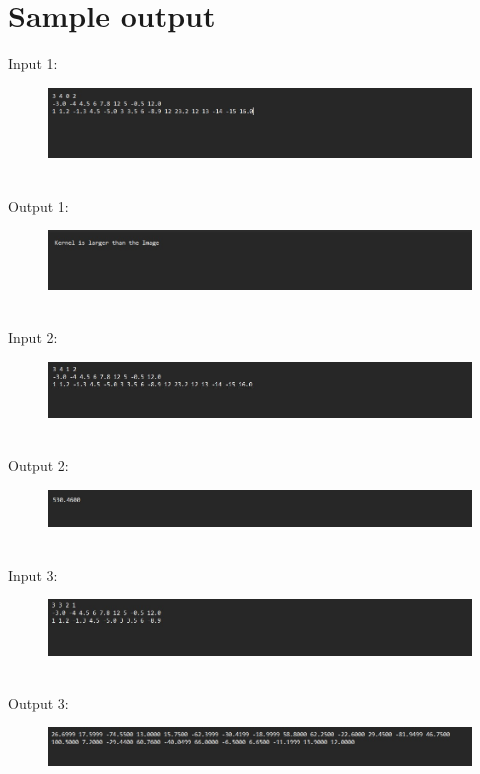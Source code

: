 \documentclass[a4paper]{article}
\begin{document}
\section{Sample output}
Input 1:
\begin{figure}[!h]
\centering
\includegraphics[scale=0.5]{Images/i1.jpg}
\end{figure}\\
Output 1:
\begin{figure}[!h]
	\centering
	\includegraphics[scale=0.5]{Images/o1.jpg}
\end{figure}\\
Input 2:
\begin{figure}[!h]
	\centering
	\includegraphics[scale=0.5]{Images/i2.jpg}
	\end{figure}\\
\pagebreak
Output 2:
\begin{figure}[!h]
	\centering
	\includegraphics[scale=0.5]{Images/o2.jpg}
	\end{figure}\\
Input 3:
\begin{figure}[!h]
	\centering
	\includegraphics[scale=0.5]{Images/i3.jpg}
	\end{figure}\\
Output 3:
\begin{figure}[!h]
	\centering
	\includegraphics[scale=0.5]{Images/o3.jpg}
	\end{figure}\\
\end{document}
